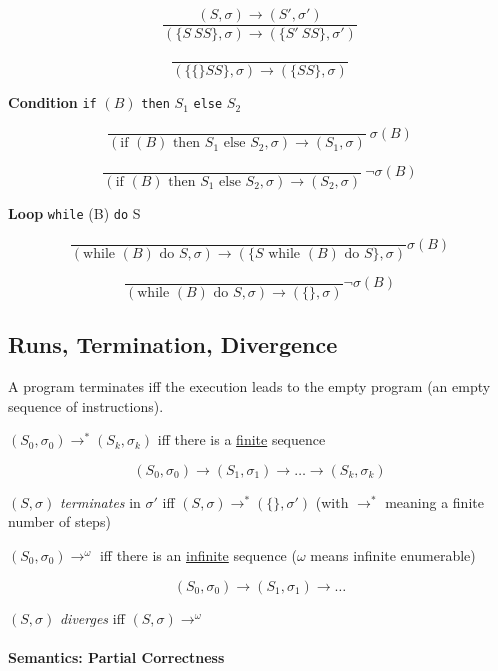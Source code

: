 \documentclass[12pt, a4paper]{book}
\begin{document}
$$
\frac{(S,\sigma) \longrightarrow (S',\sigma')}
{(\{ S\ SS \} , \sigma ) \longrightarrow (\{S'\ SS\}, \sigma')}
$$

$$
\frac{}
{(\{ \{ \} SS\}, \sigma) \longrightarrow (\{ SS \}, \sigma)}
$$

\noindent \textbf{Condition} \verb#if# $(B)$ \verb#then# $S_{1}$ \verb#else# $S_{2}$

$$
\frac{}
{(\textrm{if } (B) \textrm{ then } S_{1} \textrm{ else } S_{2}, \sigma) \longrightarrow (S_{1}, \sigma)}
\ \sigma(B)
$$

$$
\frac{}
{(\textrm{if } (B) \textrm{ then } S_{1} \textrm{ else } S_{2}, \sigma) \longrightarrow (S_{2}, \sigma)}
\ \lnot\sigma(B)
$$

\noindent \textbf{Loop} \verb#while# (B) \verb#do# S

$$
\frac{}
{(\textrm{while } (B) \textrm{ do } S, \sigma) \longrightarrow (\{ S \textrm{ while } (B) \textrm{ do } S\}, \sigma)}
\sigma(B)
$$

$$
\frac{}
{(\textrm{while } (B) \textrm{ do } S, \sigma) \longrightarrow (\{ \}, \sigma)}
\lnot\sigma(B)
$$

\subsection{Runs, Termination, Divergence}

A program terminates iff the execution leads to the empty program (an empty
sequence of instructions). \newline

$(S_{0}, \sigma_{0}) \longrightarrow^{*} (S_{k}, \sigma_{k})$ iff there is a
\underline{finite} sequence

$$
(S_{0}, \sigma_{0}) \longrightarrow (S_{1}, \sigma_{1}) \longrightarrow \ldots
\longrightarrow (S_{k}, \sigma_{k})
$$

$(S, \sigma)$ \textit{terminates} in
$\sigma'$ iff $(S, \sigma) \longrightarrow^{*} (\{\}, \sigma')$ (with
$\longrightarrow^{*}$ meaning a finite number of steps)

$(S_{0}, \sigma_{0}) \longrightarrow^{\omega}$ iff there is an
\underline{infinite} sequence ($\omega$ means infinite enumerable)

$$
(S_{0}, \sigma_{0}) \longrightarrow (S_{1}, \sigma_{1}) \longrightarrow \ldots
$$

$(S,\sigma)$ \textit{diverges} iff $(S,\sigma) \longrightarrow^{\omega}$

\paragraph{Semantics: Partial Correctness}
\end{document}
